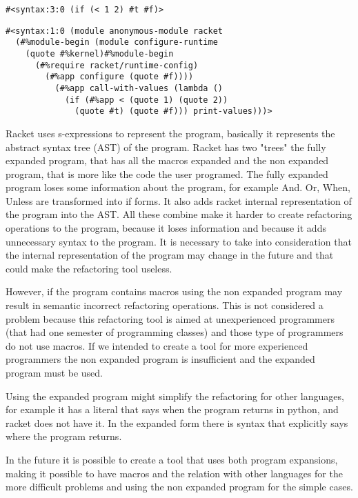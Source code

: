 \begin{lstlisting}[caption="Syntax from Example"]
#<syntax:3:0 (if (< 1 2) #t #f)>
\end{lstlisting}

\begin{lstlisting}[caption="Expanded Syntax from example"]
#<syntax:1:0 (module anonymous-module racket
  (#%module-begin (module configure-runtime
    (quote #%kernel)#%module-begin
      (#%require racket/runtime-config)
        (#%app configure (quote #f))))
          (#%app call-with-values (lambda ()
            (if (#%app < (quote 1) (quote 2))
              (quote #t) (quote #f))) print-values)))>
\end{lstlisting}


Racket uses s-expressions to represent the program, basically it represents the
abstract syntax tree (AST) of the program.
Racket has two "trees" the fully expanded program, that has all the macros
expanded and the non expanded program, that is more like the code the user programed.
The fully expanded program loses some information about the program, for example
And. Or, When, Unless are transformed into if forms.
It also adds racket internal representation of the program into the AST.
All these combine make it harder to create refactoring operations to the program,
because it loses information and because it adds unnecessary syntax to the program.
It is necessary to take into consideration that the internal representation of
the program may change in the future and that could make the refactoring tool
useless.


However, if the program contains macros using the non expanded program may
result in semantic incorrect refactoring operations. This is not considered a
problem because this refactoring tool is aimed at unexperienced programmers (that
had one semester of programming classes) and those type of programmers do not use
macros. If we intended to create a tool for more experienced programmers the non
expanded program is insufficient and the expanded program must be used.


Using the expanded program might simplify the refactoring for other languages,
for example it has a literal that says when the program returns in python, and
racket does not have it. In the expanded form there is syntax that explicitly says
where the program returns.

In the future it is possible to create a tool that uses both program expansions,
making it possible to have macros and the relation with other languages for the
more difficult problems and using the non expanded program for the simple cases.

